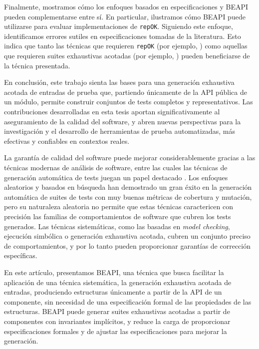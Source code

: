 Finalmente, mostramos cómo los enfoques basados en especificaciones y BEAPI pueden complementarse entre sí. 
En particular, ilustramos cómo BEAPI puede utilizarse para evaluar implementaciones de \texttt{repOK}. 
Siguiendo este enfoque, identificamos errores sutiles en especificaciones tomadas de la literatura. 
Esto indica que tanto las técnicas que requieren \texttt{repOK} (por ejemplo, \cite{Rosner15}) como aquellas que requieren suites exhaustivas acotadas (por ejemplo, \cite{Molina+2021}) 
pueden beneficiarse de la técnica presentada.

En conclusión, este trabajo sienta las bases para una generación exhaustiva acotada de entradas de prueba que, 
partiendo únicamente de la API pública de un módulo, permite construir conjuntos de tests completos y representativos. 
Las contribuciones desarrolladas en esta tesis aportan significativamente al aseguramiento de la calidad del software, 
y abren nuevas perspectivas para la investigación y el desarrollo de herramientas de prueba automatizadas, 
más efectivas y confiables en contextos reales.


La garantía de calidad del software puede mejorar considerablemente gracias a las técnicas modernas de análisis de software, 
entre las cuales las técnicas de generación automática de tests juegan un papel destacado \cite{Cadar08, Luckow14, Fraser11, Pacheco07, Ma15, Godefroid05, Marinov01, Boyapati02,Godefroid12}. 
Los enfoques aleatorios y basados en búsqueda han demostrado un gran éxito en la generación automática de suites de tests con muy buenas métricas de cobertura y mutación, 
pero su naturaleza aleatoria no permite que estas técnicas caractericen con precisión las familias de comportamientos de software 
que cubren los tests generados. Las técnicas sistemáticas, como las basadas en \emph{model checking}, ejecución simbólica 
o generación exhaustiva acotada, cubren un conjunto preciso de comportamientos, y por lo tanto pueden proporcionar garantías 
de corrección específicas.

En este artículo, presentamos BEAPI, una técnica que busca facilitar la aplicación de una técnica sistemática, 
la generación exhaustiva acotada de entradas, produciendo estructuras únicamente a partir de la API de un componente, 
sin necesidad de una especificación formal de las propiedades de las estructuras. BEAPI puede generar suites exhaustivas acotadas 
a partir de componentes con invariantes implícitos, y reduce la carga de proporcionar especificaciones formales y de ajustar 
las especificaciones para mejorar la generación. 

